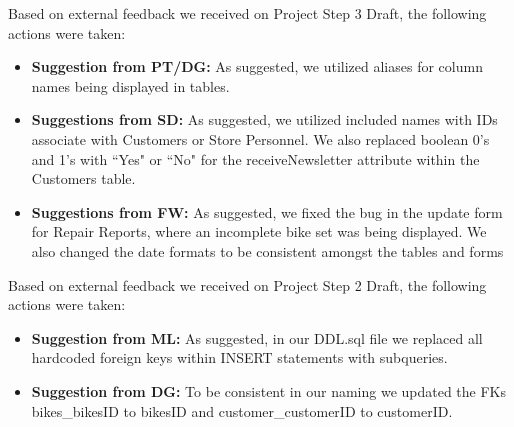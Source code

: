 \documentclass{article}
\begin{document}
\vspace{0.5cm}
\begin{tcolorbox}[colback=secondarycolor, colframe=primarycolor, arc=5mm, title=\textbf{Step 2 --> Step 3 }]
Based on external feedback we received on Project Step 3 Draft, the following actions were taken:
\vspace{0.2cm}
\begin{itemize}
   \item \textbf{Suggestion from PT/DG:} As suggested, we utilized aliases for column names being displayed in tables.
   \vspace{0.1cm}
   \item \textbf{Suggestions from SD:} As suggested, we utilized included names with IDs associate with Customers or Store Personnel. We also replaced boolean 0's and 1's with ``Yes" or ``No" for the receiveNewsletter attribute within the Customers table.
   \vspace{0.1cm}
   \item \textbf{Suggestions from FW:} As suggested, we fixed the bug in the update form for Repair Reports, where an incomplete bike set was being displayed. We also changed the date formats to be consistent amongst the tables and forms
 \end{itemize}
\vspace{0.2cm}

Based on external feedback we received on Project Step 2 Draft, the following actions were taken:
\vspace{0.2cm}
\begin{itemize}
  \item \textbf{Suggestion from ML:} As suggested, in our DDL.sql file we replaced all hardcoded foreign keys within INSERT statements with subqueries.
   \vspace{0.1cm}
  \item \textbf{Suggestion from DG:} To be consistent in our naming we updated the FKs bikes\_bikesID to bikesID and customer\_customerID to customerID.
 \end{itemize}
\vspace{0.2cm}
\end{tcolorbox}
\end{document}
